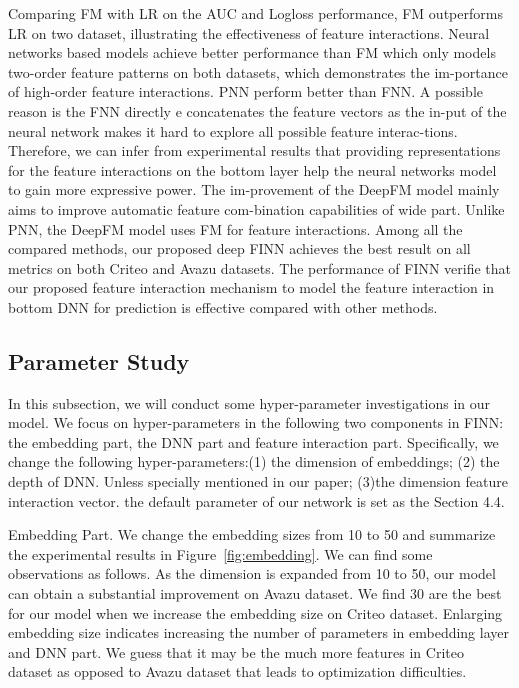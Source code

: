 \documentclass[journal]{IEEEtran}
\begin{document}
Comparing FM with LR on the AUC and Logloss performance, FM outperforms LR  on two dataset, illustrating the effectiveness of feature interactions. Neural networks based models achieve better performance than FM which only models two-order feature patterns on both datasets, which demonstrates the im-portance of high-order feature interactions. PNN perform better than FNN. A possible reason is the FNN directly e concatenates the feature vectors as the in-put of the neural network makes it hard to explore all possible feature interac-tions. Therefore, we can infer from experimental results that providing representations for the feature interactions on the bottom layer help the neural networks model to gain more expressive power. The im-provement of the DeepFM model mainly aims to improve automatic feature com-bination capabilities of wide part. Unlike PNN, the DeepFM model uses FM for feature interactions. Among all the compared methods, our proposed deep FINN achieves the best result on all metrics on both Criteo and Avazu datasets. The performance of FINN verifie that our proposed feature interaction mechanism to model the feature interaction in bottom DNN for prediction is effective compared with other methods.

\subsection{Parameter Study}
In this subsection, we will conduct some hyper-parameter investigations in our model. We focus on hyper-parameters in the following two components in FINN: the embedding part, the DNN part and feature interaction part. Specifically, we change the following hyper-parameters:(1) the dimension of embeddings; (2) the depth of DNN. Unless specially mentioned in our paper; (3)the dimension feature interaction vector. the default parameter of our network is set as the Section 4.4.

Embedding Part. We change the embedding sizes from 10 to 50 and summarize the experimental results in Figure~\ref{fig:embedding}. We can find some observations as follows. As the dimension is expanded from 10 to 50, our model can obtain a substantial improvement on Avazu dataset. We find 30 are the best for our model when we increase the embedding size on Criteo dataset. Enlarging embedding size indicates increasing the number of parameters in embedding layer and DNN part. We guess that it may be the much more features in Criteo dataset as opposed to Avazu dataset that leads to optimization difficulties.
\end{document}
